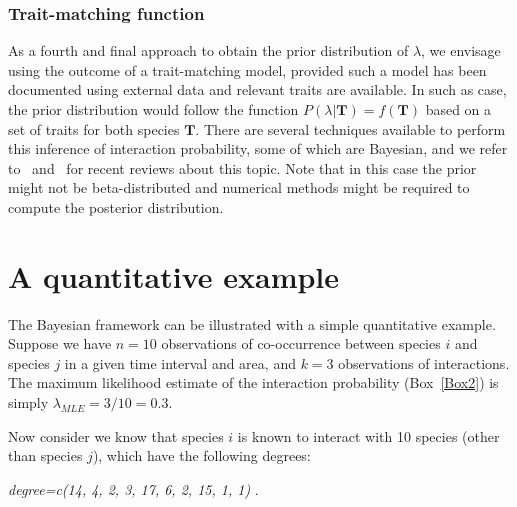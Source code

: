 \documentclass[12pt]{article}
\begin{document}
\begin{spacing}{2.0}
      \subsubsection*{Trait-matching function} 


          As a fourth and final approach to obtain the prior distribution of $\lambda$, we envisage using the outcome of a trait-matching model, provided such a model has been documented using external data and relevant traits are available. In such as case, the prior distribution would follow the function $P(\lambda|\mathbf{T})=f(\mathbf{T})$ based on a set of traits for both species $\mathbf{T}$. There are several techniques available to perform this inference of interaction probability, some of which are Bayesian, and we refer to~\citet{Bartomeus2016} and~\citet{Weinstein2017} for recent reviews about this topic. Note that in this case the prior might not be beta-distributed and numerical methods might be required to compute the posterior distribution.  


\section*{A quantitative example}

  The Bayesian framework can be illustrated with a simple quantitative example. Suppose we have $n = 10$ observations of co-occurrence between species $i$ and species $j$ in a given time interval and area, and $k = 3$ observations of interactions. The maximum likelihood estimate of the interaction probability (Box~\ref{Box2}) is simply $\lambda_{MLE} = 3/10 = 0.3$. 
  

  Now consider we know that species $i$ is known to interact with 10 species (other than species $j$), which have the following degrees:

    \vspace{12pt}
    \noindent\emph{
      degree=c(14, 4, 2, 3, 17, 6, 2, 15, 1, 1)
        }.
      \vspace{12pt}


\end{spacing}
\end{document}
